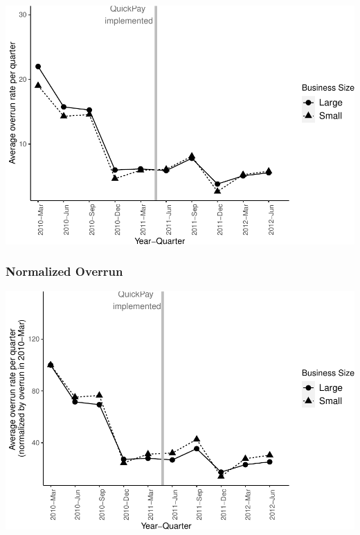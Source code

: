 \documentclass[
]{article}
\begin{document}
\includegraphics{qp_first_budget_overrun_files/figure-latex/plot_pc_overrun-1.pdf}

\hypertarget{normalized-overrun-1}{%
\subsubsection{Normalized Overrun}\label{normalized-overrun-1}}

\includegraphics{qp_first_budget_overrun_files/figure-latex/normalized_pc_plot-1.pdf}
\end{document}
